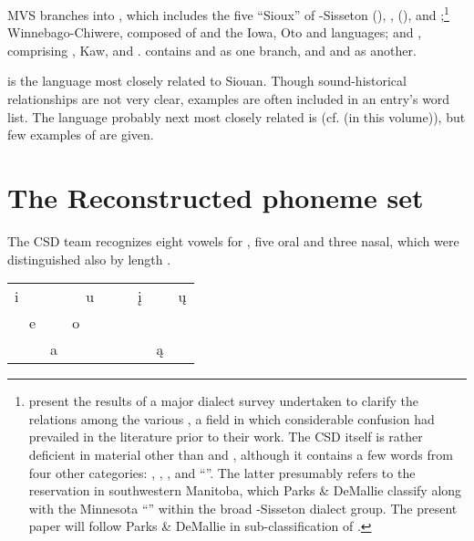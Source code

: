 \documentclass[output=paper]{LSP/langsci}
\begin{document}
\largerpage[-1] 
MVS branches into , which includes the five ``Sioux''  of -Sisseton (), ,  (),  and ;\footnote{\citet{ParksDeMallie1992} present the results of a major dialect survey undertaken to clarify the relations among the various  , a field in which considerable confusion had prevailed in the literature prior to their work.  The CSD itself is rather deficient in  material other than  and , although it contains a few words from four other categories: , , , and ``''.  The latter presumably refers to the  reservation in southwestern Manitoba, which Parks \& DeMallie classify along with the Minnesota ``'' within the broad -Sisseton dialect group.  The present paper will follow Parks \& DeMallie in sub-classification of .}  Winnebago-Chiwere, composed of  and the Iowa, Oto and  languages; and , comprising , Kaw,  and .   contains  and  as one branch, and  and  as another.
 

 is the language most closely related to Siouan.  Though sound-historic\-al relationships are not very clear,  examples are often included in an entry's word list.  The language probably next most closely related is  (cf. \citealt{Kasak2016} (in this volume)), but few examples of  are given.


\section{The Reconstructed  phoneme set}

The CSD team recognizes eight vowels for , five oral and three nasal, which were distinguished also by length \citep{RankinEtAl1998}.%
 
\ea
\begin{center}
\begin{tabular}[t]{l c r c c c c c} 
i &  & u &&& \k{i} &    & \k{u}\\

~~e &  & o~~ \\

 & a &   &&&      & \k{a} \\ 
\end{tabular}
\end{center}		
\z
\end{document}
